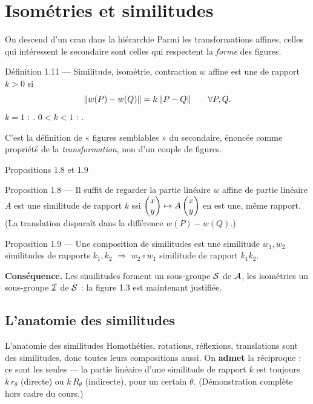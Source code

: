 \section{Isométries et similitudes}

\begin{frame}{On descend d'un cran dans la hiérarchie}
  \small Parmi les transformations affines, celles qui intéressent le
  secondaire sont celles qui respectent la \emph{forme} des figures.

  \begin{Enonce}{Définition 1.11 --- Similitude, isométrie, contraction}
    $w$ affine est une  de rapport $k>0$ si
    \[
      \lVert w(P)-w(Q) \rVert = k\,\lVert P-Q \rVert \qquad \forall P,Q.
    \]
    $k=1$ : . $0<k<1$ : .
  \end{Enonce}
  \small C'est la définition de « figures semblables » du secondaire,
  énoncée comme propriété de la \emph{transformation}, non d'un couple
  de figures.
\end{frame}

\begin{frame}{Propositions 1.8 et 1.9}
  \begin{Enonce}{Proposition 1.8 --- Il suffit de regarder la partie linéaire}
    \small $w$ affine de partie linéaire $A$ est une similitude de
    rapport $k$ ssi $\begin{pmatrix}x\\ y\end{pmatrix}\mapsto A\begin{pmatrix}x\\ y\end{pmatrix}$ en est une, même
    rapport. (La translation disparaît dans la différence
    $w(P)-w(Q)$.)
  \end{Enonce}
  \begin{Enonce}{Proposition 1.9 --- Une composition de similitudes est une similitude}
    \small $w_1,w_2$ similitudes de rapports $k_1,k_2$
    $\Rightarrow$ $w_2\circ w_1$ similitude de rapport $k_1k_2$.
  \end{Enonce}
  \vspace{4pt}
  \textbf{Conséquence.} Les similitudes forment un sous-groupe $\mathcal{S}$
  de $\mathcal{A}$, les isométries un sous-groupe $\mathcal{I}$ de $\mathcal{S}$ : la figure
  1.3 est maintenant justifiée.
\end{frame}

\subsection{L'anatomie des similitudes}
\begin{frame}{L'anatomie des similitudes}
  \small Homothéties, rotations, réflexions, translations sont des
  similitudes, donc toutes leurs compositions aussi. On \textbf{admet}
  la réciproque : ce sont les seules --- la partie linéaire d'une
  similitude de rapport $k$ est toujours $k\,r_\theta$ (directe) ou
  $k\,R_\theta$ (indirecte), pour un certain $\theta$. (Démonstration
  complète hors cadre du cours.)
\end{frame}

